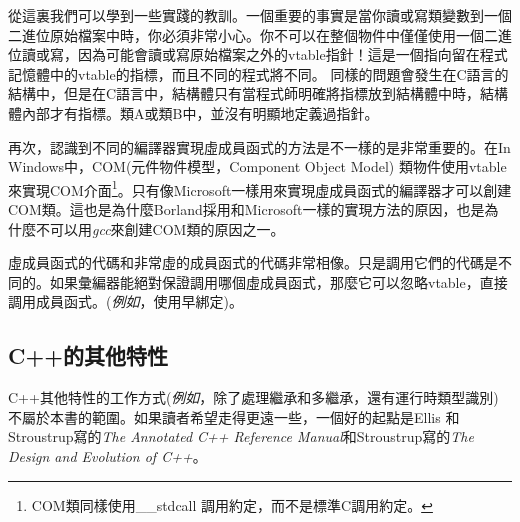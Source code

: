 從這裏我們可以學到一些實踐的教訓。一個重要的事實是當你讀或寫類變數到一個二進位原始檔案中時，你必須非常小心。你不可以在整個物件中僅僅使用一個二進位讀或寫，因為可能會讀或寫原始檔案之外的vtable指針！這是一個指向留在程式記憶體中的vtable的指標，而且不同的程式將不同。 同樣的問題會發生在C語言的結構中，但是在C語言中，結構體只有當程式師明確將指標放到結構體中時，結構體內部才有指標。類{\code A}或類{\code B}中，並沒有明顯地定義過指針。


再次，認識到不同的編譯器實現虛成員函式的方法是不一樣的是非常重要的。在In Windows中，COM(元件物件模型，Component Object Model)
類物件使用vtable來實現COM介面\footnote{COM類同樣使用{\code \_\_stdcall}
調用約定，而不是標準C調用約定。}。只有像Microsoft一樣用來實現虛成員函式的編譯器才可以創建COM類。這也是為什麼Borland採用和Microsoft一樣的實現方法的原因，也是為什麼不可以用\emph{gcc}來創建COM類的原因之一。

虛成員函式的代碼和非常虛的成員函式的代碼非常相像。只是調用它們的代碼是不同的。如果彙編器能絕對保證調用哪個虛成員函式，那麼它可以忽略vtable，直接調用成員函式。(\emph{例如}，使用早綁定)。

\subsection{C++的其他特性}

C++其他特性的工作方式(\emph{例如}，除了處理繼承和多繼承，還有運行時類型識別)不屬於本書的範圍。如果讀者希望走得更遠一些，一個好的起點是Ellis
和Stroustrup寫的\emph{The Annotated C++ Reference
Manual}和Stroustrup寫的\emph{The Design and Evolution of C++}。

